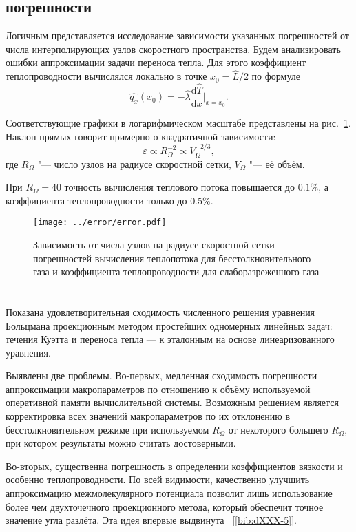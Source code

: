 \documentclass[english,russian,a4paper,12pt]{article}
\newcommand{\D}{\mathrm{d}}
\begin{document}
\subsection*{ погрешности}

Логичным представляется исследование зависимости указанных погрешностей от числа интерполирующих узлов
скоростного пространства. Будем анализировать ошибки аппроксимации задачи переноса тепла.
Для этого коэффициент теплопроводности вычислялся локально в точке \(x_0=\hat L/2\) по формуле
\[ \hat{q_x}(x_0) = -\hat{\lambda}\frac{\D\hat T}{\D x}\bigg|_{x=x_0}. \]

Соответствующие графики в логарифмическом масштабе представлены на рис.~\ref{fig:error}.
Наклон прямых говорит примерно о квадратичной зависимости:
\[ \varepsilon \propto R_\Omega^{-2} \propto V_\Omega^{-2/3}, \]
где \(R_\Omega\) "--- число узлов на радиусе скоростной сетки, \(V_\Omega\) "--- её объём.

При \(R_\Omega = 40\) точность вычисления теплового потока повышается до \(0.1\%\),
а коэффициента теплопроводности только до \(0.5\%\).

\begin{figure}
	\centering
	\texttt{[image: ../error/error.pdf]}
	\caption{
		Зависимость от числа узлов на радиусе скоростной сетки погрешностей вычисления 
		теплопотока для бесстолкновительного газа и коэффициента теплопроводности для слаборазреженного газа
	}\label{fig:error}
\end{figure}

\section*{}

Показана удовлетворительная сходимость численного решения уравнения Больцмана проекционным методом
простейших одномерных линейных задач: течения Куэтта и переноса тепла --- к эталонным на основе
линеаризованного уравнения.

Выявлены две проблемы. Во-первых, медленная сходимость погрешности аппроксимации макропараметров по отношению к
объёму используемой оперативной памяти вычислительной системы. Возможным решением является корректировка всех значений макропараметров
по их отклонению в бесстолкновительном режиме при используемом \(R_\Omega\) от некоторого большего \(R_\Omega\),
при котором результаты можно считать достоверными.

Во-вторых, существенна погрешность в определении коэффициентов вязкости и особенно теплопроводности.
По всей видимости, качественно улучшить аппроксимацию межмолекулярного потенциала позволит лишь использование
более чем двухточечного проекционного метода, который обеспечит точное значение угла разлёта.
Эта идея впервые выдвинута ~[\ref{bib:dXXX-5}].
\end{document}
